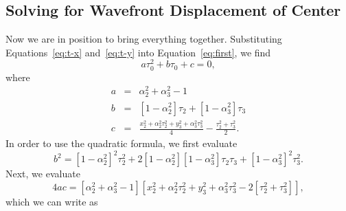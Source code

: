 \documentclass[twocolumn]{article}
\begin{document}
\subsection{Solving for Wavefront Displacement of Center}

Now we are in position to bring everything together. Substituting
Equations~\ref{eq:t-x} and~\ref{eq:t-y} into Equation~\ref{eq:first}, we find
\begin{equation}
   a\tau_0^2 + b\tau_0 + c = 0,
\end{equation}
where
\begin{eqnarray}
   a &=& \alpha_2^2 + \alpha_3^2 - 1\\[5pt]
   b &=& \left[1 - \alpha_2^2\right]\tau_2 + \left[1 -
         \alpha_3^2\right]\tau_3\\[5pt]
   c &=& \frac{x_2^2 + \alpha_2^2\tau_2^2 + y_3^2 + \alpha_3^2\tau_3^2}{4} -
         \frac{\tau_2^2 + \tau_3^2}{2}.
\end{eqnarray}
In order to use the quadratic formula, we first evaluate
\begin{equation}
   b^2 = \left[1 - \alpha_2^2\right]^2 \tau_2^2 + 2 \left[1 -
   \alpha_2^2\right]\left[1 - \alpha_3^2\right] \tau_2 \tau_3 + \left[1 -
   \alpha_3^2\right]^2 \tau_3^2.
\end{equation}
Next, we evaluate
\begin{equation}
   4ac = \left[\alpha_2^2 + \alpha_3^2 - 1\right] \left[x_2^2 + \alpha_2^2
   \tau_2^2 + y_3^2 + \alpha_3^2 \tau_3^2 - 2\left[\tau_2^2 +
   \tau_3^2\right]\right],
\end{equation}
which we can write as
\end{document}
